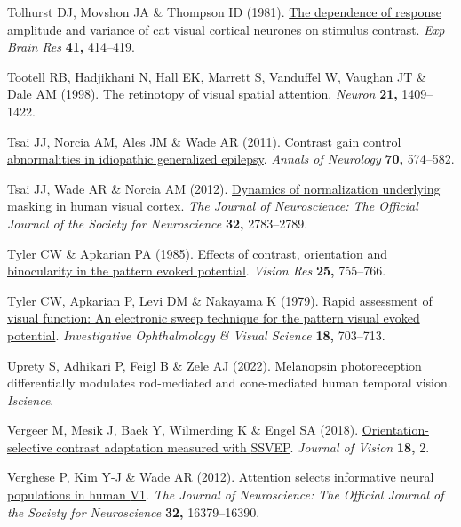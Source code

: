 \documentclass[
  letterpaper,
  DIV=11,
  numbers=noendperiod]{scrartcl}
\newlength{\cslhangindent}
\newenvironment{CSLReferences}[2] %
 {\begin{list}{}{%
  \setlength{\itemindent}{0pt}
  \setlength{\leftmargin}{0pt}
  \setlength{\parsep}{0pt}
  \ifodd #1
   \setlength{\leftmargin}{\cslhangindent}
   \setlength{\itemindent}{-1\cslhangindent}
  \fi
  \setlength{\itemsep}{#2\baselineskip}}}
 {\end{list}}
\begin{document}
\begin{CSLReferences}{1}{1}
Tolhurst DJ, Movshon JA \& Thompson ID (1981).
\href{https://doi.org/10.1007/BF00238900}{The dependence of response
amplitude and variance of cat visual cortical neurones on stimulus
contrast}. \emph{Exp Brain Res} \textbf{41,} 414--419.

Tootell RB, Hadjikhani N, Hall EK, Marrett S, Vanduffel W, Vaughan JT \&
Dale AM (1998). \href{https://doi.org/10.1016/s0896-6273(00)80659-5}{The
retinotopy of visual spatial attention}. \emph{Neuron} \textbf{21,}
1409--1422.

Tsai JJ, Norcia AM, Ales JM \& Wade AR (2011).
\href{https://doi.org/10.1002/ana.22462}{Contrast gain control
abnormalities in idiopathic generalized epilepsy}. \emph{Annals of
Neurology} \textbf{70,} 574--582.

Tsai JJ, Wade AR \& Norcia AM (2012).
\href{https://doi.org/10.1523/JNEUROSCI.4485-11.2012}{Dynamics of
normalization underlying masking in human visual cortex}. \emph{The
Journal of Neuroscience: The Official Journal of the Society for
Neuroscience} \textbf{32,} 2783--2789.

Tyler CW \& Apkarian PA (1985).
\href{https://doi.org/10.1016/0042-6989(85)90183-x}{Effects of contrast,
orientation and binocularity in the pattern evoked potential}.
\emph{Vision Res} \textbf{25,} 755--766.

Tyler CW, Apkarian P, Levi DM \& Nakayama K (1979).
\href{https://www.ncbi.nlm.nih.gov/pubmed/447469}{Rapid assessment of
visual function: An electronic sweep technique for the pattern visual
evoked potential}. \emph{Investigative Ophthalmology \& Visual Science}
\textbf{18,} 703--713.

Uprety S, Adhikari P, Feigl B \& Zele AJ (2022). Melanopsin
photoreception differentially modulates rod-mediated and cone-mediated
human temporal vision. \emph{Iscience}.

Vergeer M, Mesik J, Baek Y, Wilmerding K \& Engel SA (2018).
\href{https://doi.org/10.1167/18.5.2}{Orientation-selective contrast
adaptation measured with {SSVEP}}. \emph{Journal of Vision} \textbf{18,}
2.

Verghese P, Kim Y-J \& Wade AR (2012).
\href{https://doi.org/10.1523/JNEUROSCI.1174-12.2012}{Attention selects
informative neural populations in human {V1}}. \emph{The Journal of
Neuroscience: The Official Journal of the Society for Neuroscience}
\textbf{32,} 16379--16390.


\end{CSLReferences}
\end{document}
